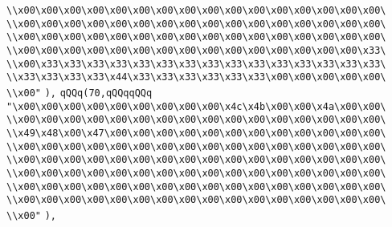 \verb|\\x00\x00\x00\x00\x00\x00\x00\x00\x00\x00\x00\x00\x00\x00\x00\x00\|\newline
\verb|\\x00\x00\x00\x00\x00\x00\x00\x00\x00\x00\x00\x00\x00\x00\x00\x00\|\newline
\verb|\\x00\x00\x00\x00\x00\x00\x00\x00\x00\x00\x00\x00\x00\x00\x00\x00\|\newline
\verb|\\x00\x00\x00\x00\x00\x00\x00\x00\x00\x00\x00\x00\x00\x00\x00\x33\|\newline
\verb|\\x00\x33\x33\x33\x33\x33\x33\x33\x33\x33\x33\x33\x33\x33\x33\x33\|\newline
\verb|\\x33\x33\x33\x33\x44\x33\x33\x33\x33\x33\x33\x00\x00\x00\x00\x00\|\newline
\verb|\\x00"|\newline
\verb|),|\newline
\verb|qQQq(70,qQQqqQQq|\newline
\verb|"\x00\x00\x00\x00\x00\x00\x00\x00\x00\x4c\x4b\x00\x00\x4a\x00\x00\|\newline
\verb|\\x00\x00\x00\x00\x00\x00\x00\x00\x00\x00\x00\x00\x00\x00\x00\x00\|\newline
\verb|\\x49\x48\x00\x47\x00\x00\x00\x00\x00\x00\x00\x00\x00\x00\x00\x00\|\newline
\verb|\\x00\x00\x00\x00\x00\x00\x00\x00\x00\x00\x00\x00\x00\x00\x00\x00\|\newline
\verb|\\x00\x00\x00\x00\x00\x00\x00\x00\x00\x00\x00\x00\x00\x00\x00\x00\|\newline
\verb|\\x00\x00\x00\x00\x00\x00\x00\x00\x00\x00\x00\x00\x00\x00\x00\x00\|\newline
\verb|\\x00\x00\x00\x00\x00\x00\x00\x00\x00\x00\x00\x00\x00\x00\x00\x00\|\newline
\verb|\\x00\x00\x00\x00\x00\x00\x00\x00\x00\x00\x00\x00\x00\x00\x00\x00\|\newline
\verb|\\x00"|\newline
\verb|),|\newline
